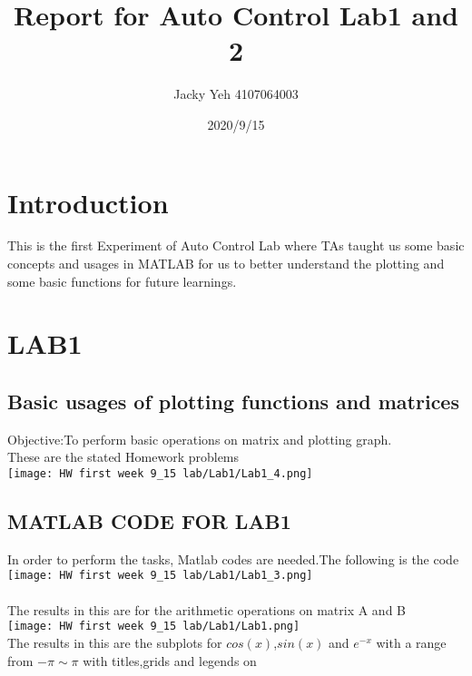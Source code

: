 \documentclass[12pt]{article}
\title{Report for Auto Control Lab1 and 2}
\date{2020/9/15}
\author{Jacky Yeh 4107064003}
\begin{document}
\begin{titlepage}

\maketitle
\end{titlepage}


\section{Introduction}
This is the first Experiment of Auto Control Lab where TAs taught us some basic concepts and usages in MATLAB for us to better understand the plotting and some basic functions for future learnings.\\

\section{LAB1}
\subsection{Basic usages of plotting functions and matrices}
Objective:To perform basic operations on matrix and plotting graph.\\
These are the stated Homework problems\\
\texttt{[image: HW first week 9\_15 lab/Lab1/Lab1\_4.png]} \\

\subsection{MATLAB CODE FOR LAB1}
In order to perform the tasks, Matlab codes are needed.The following is the code\\

\texttt{[image: HW first week 9\_15 lab/Lab1/Lab1\_3.png]}\\
\\
The results in this are for the arithmetic operations on matrix A and B\\

\texttt{[image: HW first week 9\_15 lab/Lab1/Lab1.png]}\\

The results in this are the subplots for $cos(x)$,$sin(x)$ and $e^{-x}$ with a 
range from $-\pi \sim \pi$ with titles,grids and legends on\\
\end{document}
